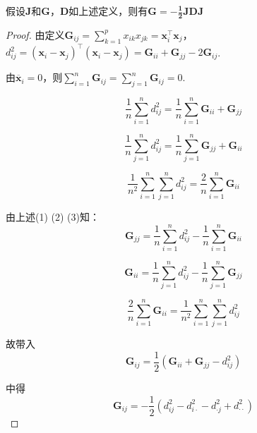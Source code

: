 \begin{theorem}
假设$\mathbf{J}$和$\mathbf{G}$，$\mathbf{D}$如上述定义，则有$\mathbf{G = -\frac{1}{2} JDJ}$
\end{theorem}
\begin{proof}
由定义$\mathbf{G}_{ij} = \sum_{k=1}^p x_{ik}x_{jk} = \mathbf{x}_i^\intercal \mathbf{x}_j$，$d_{ij}^2 = (\mathbf{x}_i - \mathbf{x}_j)^\intercal (\mathbf{x}_i - \mathbf{x}_j) = \mathbf{G}_{ii} + \mathbf{G}_{jj} - 2\mathbf{G}_{ij}$. 

由$\overline{\mathbf{x}}_i = 0$，则$\sum_{i=1}^n\mathbf{G}_{ij} = \sum_{j=1}^n\mathbf{G}_{ij} = 0$.

\begin{equation}
    \frac{1}{n}\sum_{i=1}^nd_{ij}^2 = \frac{1}{n}\sum_{i=1}^n\mathbf{G}_{ii} + \mathbf{G}_{jj}
\end{equation}

\begin{equation}
    \frac{1}{n}\sum_{j=1}^nd_{ij}^2 = \frac{1}{n}\sum_{j=1}^n\mathbf{G}_{jj} + \mathbf{G}_{ii}
\end{equation}

\begin{equation}
    \frac{1}{n^2}\sum_{i=1}^n\sum_{j=1}^nd_{ij}^2 = \frac{2}{n}\sum_{i=1}^n\mathbf{G}_{ii}
\end{equation}

由上述(1) (2) (3)知：
\begin{equation*}
    \mathbf{G}_{jj} = \frac{1}{n}\sum_{i=1}^nd_{ij}^2 - \frac{1}{n}\sum_{i=1}^n\mathbf{G}_{ii}
\end{equation*}

\begin{equation*}
    \mathbf{G}_{ii} = \frac{1}{n}\sum_{j=1}^nd_{ij}^2 - \frac{1}{n}\sum_{j=1}^n\mathbf{G}_{jj}
\end{equation*}

\begin{equation*}
    \frac{2}{n}\sum_{i=1}^n\mathbf{G}_{ii} = \frac{1}{n^2}\sum_{i=1}^n\sum_{j=1}^nd_{ij}^2
\end{equation*}

故带入
\begin{equation*}
    \mathbf{G}_{ij} = \frac{1}{2}(\mathbf{G}_{ii} + \mathbf{G}_{jj} - d_{ij}^2)
\end{equation*}

中得
\begin{equation*}
    \mathbf{G}_{ij} = -\frac{1}{2}(d_{ij}^2 - d_{i\cdot}^2 - d_{\cdot j}^2 + d_{\cdot\cdot}^2)
\end{equation*}
\end{proof}

